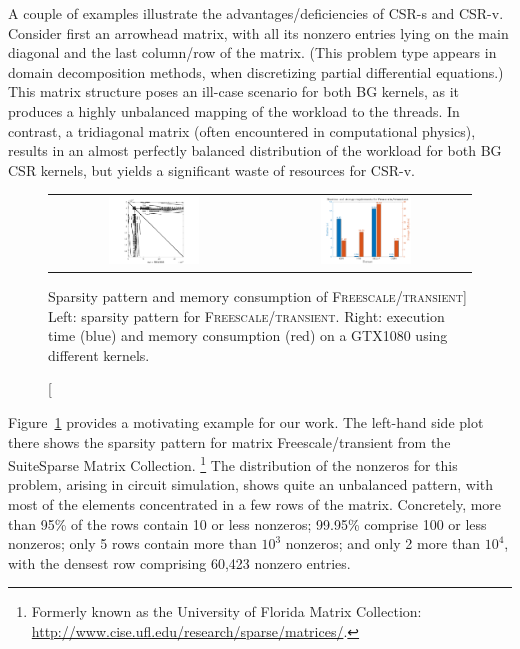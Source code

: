 A couple of examples illustrate the advantages/deficiencies
of CSR-s and CSR-v.
Consider first an arrowhead matrix,
with all its nonzero entries lying on the main diagonal
and the last column/row of the matrix.
(This problem type appears in domain decomposition methods,
when discretizing partial differential equations.)
This matrix structure poses an ill-case scenario for both BG kernels,
as it produces a highly unbalanced mapping of the workload to the threads.
In contrast, a tridiagonal matrix
(often encountered in computational physics),
results in an almost perfectly balanced distribution
of the workload for both BG CSR kernels,
but yields a significant waste of resources for CSR-v.

\begin{figure}[t]
\begin{center}
\begin{tabular}{cc}
\includegraphics[width=0.45\textwidth]{plots/pattern.pdf} &
\includegraphics[width=0.45\textwidth]{plots/motivation.pdf}
\end{tabular}
\end{center}
\caption
    [Sparsity pattern and memory consumption of \textsc{Freescale/transient}]
    {Left: sparsity pattern for \textsc{Freescale/transient}.
    Right: execution time (blue) and memory consumption (red) on a GTX1080
    using different \spmv kernels.}
\label{2017-csr-spmv:fig:motivation}
\end{figure}

Figure~\ref{2017-csr-spmv:fig:motivation} provides a motivating example for our work.
The left-hand side plot there shows the sparsity pattern for matrix
{\sc Freescale/transient} from the SuiteSparse Matrix Collection.%
\footnote{Formerly known as the University of Florida Matrix Collection:
\mbox{\url{http://www.cise.ufl.edu/research/sparse/matrices/}}.}
The distribution of the nonzeros for this problem,
arising in circuit simulation, shows quite an unbalanced pattern,
with most of the elements concentrated in a few rows of the matrix.
Concretely, more than 95\% of the rows contain 10 or less nonzeros;
99.95\% comprise 100 or less nonzeros;
only 5 rows contain more than $10^3$ nonzeros; and only 2 more than $10^4$,
with the densest row comprising
60,423 nonzero entries.

